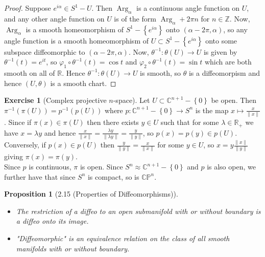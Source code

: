 \documentclass[reqno]{amsart}
\theoremstyle{plain}%
\newtheorem{proposition}[theorem]{Proposition}
\theoremstyle{definition}
\newtheorem{exercise}[theorem]{Exercise}
\theoremstyle{remark}
\DeclareMathOperator{\Arg}{Arg}
\begin{document}
    \begin{proof}
        Suppose $e^{i \alpha} \in S^{1} - U$. Then
        $\Arg_{\alpha}$ is a continuous angle function on
        $U$, and any other angle function on $U$ is of the form
        $\Arg_{\alpha} + 2 \pi n$ for $n \in \mathbb{Z}$.
        Now, $\Arg_{\alpha}$ is a smooth homeomorphism of
        $S^{1} - \left\{ e^{i \alpha} \right\} $ onto
        $\left( \alpha - 2 \pi, \alpha \right) $, so
        any angle function is a smooth homeomorphism of
        $U \subset S^{1} - \left\{ e^{i \alpha} \right\} $ onto some
        subspace diffeomorphic to $\left( \alpha - 2\pi, \alpha \right) $.
        Now, $\theta^{-1}  \colon \theta (U) \to U$ is given by
        $\theta^{-1} (t) = e^{it}$, so
        $\varphi_1 \circ \theta^{-1}(t) = \cos t$ and
        $\varphi_2 \circ \theta^{-1}(t) = \sin t$ which are both
        smooth on all of $\mathbb{R}$. Hence
        $\theta^{-1}  \colon \theta (U) \to U$ is smooth, so
        $\theta$ is a diffeomorpism and hence
        $\left( U, \theta \right) $ is a smooth chart.
    \end{proof}

    \begin{exercise}[Complex projective $n$-space]
        Let $U \subset \mathbb{C}^{n+1} - \left\{ 0 \right\} $ 
        be open. Then
        $\pi^{-1} \left( \pi (U) \right) 
        = p^{-1} \left( p (U) \right) $ where
        $p  \colon \mathbb{C}^{n+1} - \left\{ 0 \right\} 
        \to S^{n}$ is the map
        $x \mapsto \frac{x}{\|x\|}$.
        Since if $\pi (x) \in \pi (U)$ then
        there exists $y \in U$ such that for some
        $\lambda \in \mathbb{R}_+$  we have
        $x = \lambda y$ and hence
        $\frac{x}{\|x\|} = \frac{\lambda y}{\|\lambda y\|}
        = \frac{y}{\|y\|}$, so 
        $p(x) = p(y) \in p\left( U \right) $. Conversely,
        if $p(x) \in p(U)$ then 
        $\frac{y}{\|y\|} = \frac{x}{\|x\|}$ for some $y \in U$, so
        $x = y \frac{\|x\|}{\|y\|}$ giving
        $\pi(x) = \pi(y)$.\\
        Since $p$ is continuous, $\pi$ is open. Since 
        $S^{n} \approx \mathbb{C}^{n+1} - \left\{ 0 \right\} $ and
        $p$ is also open, we further have that since
        $S^{n}$ is compact, so is $\mathbb{C}\mathbb{P}^{n}$.
    \end{exercise}

    \begin{proposition}[2.15 (Properties of Diffeomorphisms)]
        \begin{itemize}
            \item The restriction of a diffeo to an open 
                submanifold with or without boundary is a 
                diffeo onto its image.
            \item "Diffeomorphic" is an equivalence relation
                on the class of all smooth manifolds with
                or without boundary.
        \end{itemize}
    \end{proposition}
\end{document}
